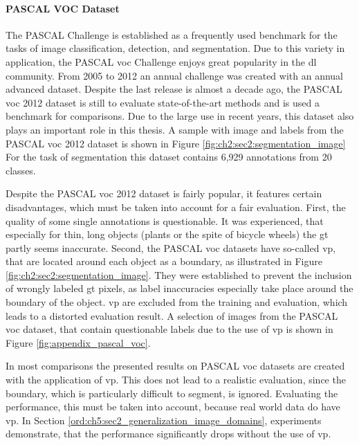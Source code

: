 \paragraph{PASCAL VOC Dataset}

The PASCAL  Challenge \cite{Eve20-PascalVOC} is established as a frequently used benchmark for the tasks of image classification, detection, and segmentation.
Due to this variety in application, the PASCAL \gls{voc} Challenge enjoys great popularity in the \gls{dl} community.
From 2005 to 2012 an annual challenge was created with an annual advanced dataset.
Despite the last release is almost a decade ago, the PASCAL \gls{voc} 2012 dataset is still to evaluate state-of-the-art methods and is used a benchmark for comparisons.
Due to the large use in recent years, this dataset also plays an important role in this thesis.
A sample with image and labels from the PASCAL \gls{voc} 2012 dataset is shown in Figure \ref{fig:ch2:sec2:segmentation_image}
For the task of segmentation this dataset contains 6,929 annotations from 20 classes.

Despite the PASCAL \gls{voc} 2012 dataset is fairly popular, it features certain disadvantages, which must be taken into account for a fair evaluation.
First, the quality of some single annotations is questionable.
It was experienced, that especially for thin, long objects (\eg plants or the spite of bicycle wheels) the \gls{gt} partly seems inaccurate.
Second, the PASCAL \gls{voc} datasets have so-called \gls{vp}, that are located around each object as a boundary, as illustrated in Figure \ref{fig:ch2:sec2:segmentation_image}.
They were established to prevent the inclusion of wrongly labeled \gls{gt} pixels, as label inaccuracies especially take place around the boundary of the object.  
\gls{vp} are excluded from the training and evaluation, which leads to a distorted evaluation result.
A selection of images from the PASCAL \gls{voc} dataset, that contain questionable labels due to the use of \gls{vp} is shown in Figure \ref{fig:appendix_pascal_voc}.

In most comparisons the presented results on PASCAL \gls{voc} datasets are created with the application of \gls{vp}.
This does not lead to a realistic evaluation, since the boundary, which is particularly difficult to segment, is ignored.
Evaluating the performance, this must be taken into account, because real world data do have \gls{vp}. 
In Section \ref{ord:ch5:sec2_generalization_image_domains}, experiments demonstrate, that the performance significantly drops without the use of \gls{vp}.

